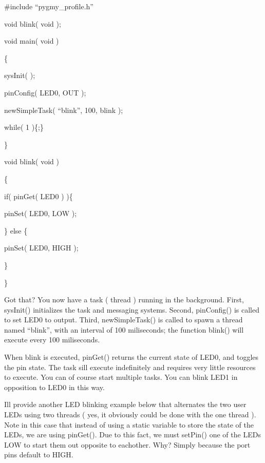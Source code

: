 \documentclass{article}
\begin{document}
\bigskip

\#include {\textquotedblleft}pygmy\_profile.h{\textquotedblright}


\bigskip

void blink( void );


\bigskip

void main( void )

\{

sysInit( );

pinConfig( LED0, OUT );

newSimpleTask( {\textquotedblleft}blink{\textquotedblright}, 100, blink );


\bigskip

while( 1 )\{;\}

\}


\bigskip

void blink( void )

\{

if( pinGet( LED0 ) )\{

pinSet( LED0, LOW );

\} else \{

pinSet( LED0, HIGH );

\}

\}


\bigskip

Got that? You now have a task ( thread ) running in the background. First, sysInit() initializes the task and messaging systems. Second, pinConfig() is called to set LED0 to output. Third, newSimpleTask() is called to spawn a thread named {\textquotedblleft}blink{\textquotedblright}, with an interval of 100 miliseconds; the function blink() will execute every 100 miliseconds.

When blink is executed, pinGet() returns the current state of LED0, and toggles the pin state. The task sill execute indefinitely and requires very little resources to execute. You can of course start multiple tasks. You can blink LED1 in opposition to LED0 in this way.

I{\textquotesingle}ll provide another LED blinking example below that alternates the two user LEDs using two threads ( yes, it obviously could be done with the one thread ). Note in this case that instead of using a static variable to store the state of the LEDs, we are using pinGet(). Due to this fact, we must setPin() one of the LEDs LOW to start them out opposite to eachother. Why? Simply because the port pins default to HIGH.


\bigskip
\end{document}
